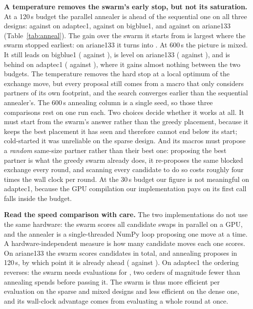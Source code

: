 \documentclass[10pt]{article}
\begin{document}
\textbf{A temperature removes the swarm's early stop, but not its saturation.} At a 120\,s budget the parallel annealer is ahead of the sequential one on all three designs: \nParallelHome{} against \nAnnealHomeMid{} on adaptec1, \nParallelBigblue{} against \nAnnealBigblueMid{} on bigblue1, and \nParallelAriane{} against \nAnnealArianeMid{} on ariane133 (Table~\ref{tab:anneal}). The gain over the swarm it starts from is largest where the swarm stopped earliest: on ariane133 it turns \nSwarmAriane{} into \nParallelAriane{}. At 600\,s the picture is mixed. It still leads on bigblue1 (\nParallelBigblueLong{} against \nAnnealBigblueLong{}), is level on ariane133 (\nParallelArianeLong{} against \nAnnealArianeLong{}), and is behind on adaptec1 (\nParallelHomeLong{} against \nAnnealHomeLong{}), where it gains almost nothing between the two budgets. The temperature removes the hard stop at a local optimum of the exchange move, but every proposal still comes from a macro that only considers partners of its own footprint, and the search converges earlier than the sequential annealer's. The 600\,s annealing column is a single seed, so those three comparisons rest on one run each. Two choices decide whether it works at all. It must start from the swarm's answer rather than the greedy placement, because it keeps the best placement it has seen and therefore cannot end below its start; cold-started it was unreliable on the sparse design. And its macros must propose a \emph{random} same-size partner rather than their best one: proposing the best partner is what the greedy swarm already does, it re-proposes the same blocked exchange every round, and scanning every candidate to do so costs roughly four times the wall clock per round. At the 30\,s budget our figure is not meaningful on adaptec1, because the GPU compilation our implementation pays on its first call falls inside the budget.

\textbf{Read the speed comparison with care.} The two implementations do not use the same hardware: the swarm scores all candidate swaps in parallel on a GPU, and the annealer is a single-threaded NumPy loop proposing one move at a time. A hardware-independent measure is how many candidate moves each one scores. On ariane133 the swarm scores \nSwarmEvalsAriane{} candidates in total, and annealing proposes \nAnnealMovesAriane{} in 120\,s, by which point it is already ahead (\nAnnealArianeMid{} against \nSwarmAriane{}). On adaptec1 the ordering reverses: the swarm needs \nSwarmEvalsAdaptec{} evaluations for \nSwarmHome{}, two orders of magnitude fewer than annealing spends before passing it. The swarm is thus more efficient per evaluation on the sparse and mixed designs and less efficient on the dense one, and its wall-clock advantage comes from evaluating a whole round at once.
\end{document}
